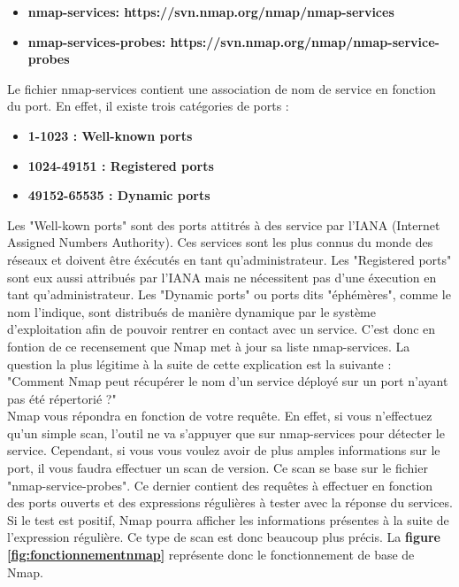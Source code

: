 \begin{itemize}
    \item \textbf{nmap-services: https://svn.nmap.org/nmap/nmap-services}
    \item \textbf{nmap-services-probes: https://svn.nmap.org/nmap/nmap-service-probes}
\end{itemize}

 Le fichier nmap-services contient une association de nom de service en fonction du port. En effet, il existe trois catégories de ports :

\begin{itemize}
    \item \textbf{1-1023 : Well-known ports}
    \item \textbf{1024-49151 : Registered ports}
    \item \textbf{49152-65535 : Dynamic ports}
\end{itemize}

 Les "Well-kown ports" sont des ports attitrés à des service par l'IANA (Internet Assigned Numbers Authority). Ces services sont les plus connus du monde des réseaux et doivent être éxécutés en tant qu'administrateur. Les "Registered ports" sont eux aussi attribués par l'IANA mais ne nécessitent pas d'une éxecution en tant qu'administrateur. Les "Dynamic ports" ou ports dits "éphémères", comme le nom l'indique, sont distribués de manière dynamique par le système d'exploitation afin de pouvoir rentrer en contact avec un service. C'est donc en fontion de ce recensement que Nmap met à jour sa liste nmap-services. La question la plus légitime à la suite de cette explication est la suivante :\\
"Comment Nmap peut récupérer le nom d'un service déployé sur un port n'ayant pas été répertorié ?"\\
Nmap vous répondra en fonction de votre requête. En effet, si vous n'effectuez qu'un simple scan, l'outil ne va s'appuyer que sur nmap-services pour détecter le service. Cependant, si vous vous voulez avoir de plus amples informations sur le port, il vous faudra effectuer un scan de version. Ce scan se base sur le fichier "nmap-service-probes". Ce dernier contient des requêtes à effectuer en fonction des ports ouverts et des expressions régulières à tester avec la réponse du services. Si le test est positif, Nmap pourra afficher les informations présentes à la suite de l'expression régulière. Ce type de scan est donc beaucoup plus précis. La \textbf{figure \ref{fig:fonctionnementnmap}} représente donc le fonctionnement de base de Nmap.

